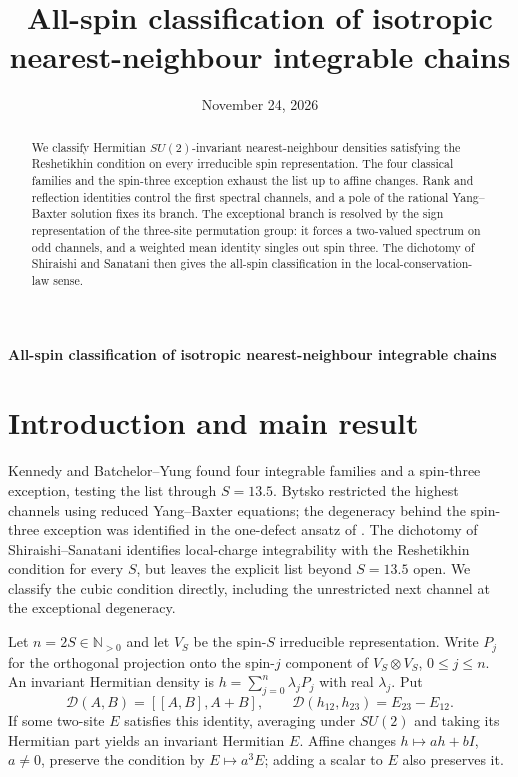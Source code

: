 \documentclass[11pt]{article}
\title{All-spin classification of isotropic nearest-neighbour integrable chains}
\author{}
\date{November 24, 2026}
\newcommand{\DD}{\mathcal D}
\begin{document}
\begin{center}
 {\LARGE\bfseries All-spin classification of isotropic nearest-neighbour integrable chains\par}
 \vspace{0.6em}{\small November 24, 2026}
\end{center}
\begin{abstract}
We classify Hermitian $SU(2)$-invariant nearest-neighbour densities satisfying the Reshetikhin condition on every irreducible spin representation. The four classical families and the spin-three exception exhaust the list up to affine changes. Rank and reflection identities control the first spectral channels, and a pole of the rational Yang--Baxter solution fixes its branch. The exceptional branch is resolved by the sign representation of the three-site permutation group: it forces a two-valued spectrum on odd channels, and a weighted mean identity singles out spin three. The dichotomy of Shiraishi and Sanatani then gives the all-spin classification in the local-conservation-law sense.
\end{abstract}

\section{Introduction and main result}
Kennedy \cite{Kennedy} and Batchelor--Yung \cite{BY} found four integrable families and a spin-three exception, testing the list through $S=13.5$. Bytsko \cite{Bytsko1,Bytsko2} restricted the highest channels using reduced Yang--Baxter equations; the degeneracy behind the spin-three exception was identified in the one-defect ansatz of \cite[Sec.~4.3]{Bytsko2}. The dichotomy of Shiraishi--Sanatani \cite{SS} identifies local-charge integrability with the Reshetikhin condition for every $S$, but leaves the explicit list beyond $S=13.5$ open. We classify the cubic condition directly, including the unrestricted next channel at the exceptional degeneracy.

Let $n=2S\in\mathbb N_{>0}$ and let $V_S$ be the spin-$S$ irreducible representation. Write $P_j$ for the orthogonal projection onto the spin-$j$ component of $V_S\otimes V_S$, $0\le j\le n$. An invariant Hermitian density is $h=\sum_{j=0}^n\lambda_j P_j$ with real $\lambda_j$. Put
\begin{equation}\label{RC}
 \DD(A,B)=[[A,B],A+B],\qquad
 \DD(h_{12},h_{23})=E_{23}-E_{12}.
\end{equation}
If some two-site $E$ satisfies this identity, averaging under $SU(2)$ and taking its Hermitian part yields an invariant Hermitian $E$. Affine changes $h\mapsto ah+bI$, $a\ne0$, preserve the condition by $E\mapsto a^3 E$; adding a scalar to $E$ also preserves it.
\end{document}
